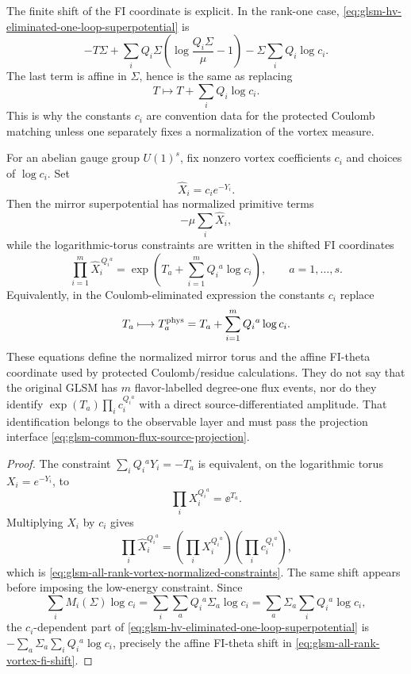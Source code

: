 The finite shift of the FI coordinate is explicit.  In the rank-one case,
\eqref{eq:glsm-hv-eliminated-one-loop-superpotential} is
\[
  -T\Sigma
  +
  \sum_iQ_i\Sigma
  \left(
    \log\frac{Q_i\Sigma}{\mu}-1
  \right)
  -
  \Sigma\sum_iQ_i\log c_i .
\]
The last term is affine in \(\Sigma\), hence is the same as replacing
\[
  T\longmapsto T+\sum_iQ_i\log c_i .
\]
This is why the constants \(c_i\) are convention data for the protected
Coulomb matching unless one separately fixes a normalization of the vortex
measure.

\begin{proposition}
\label{prop:glsm-vortex-normalization-fi-coordinate}
For an abelian gauge group \(U(1)^s\), fix nonzero vortex coefficients
\(c_i\) and choices of \(\log c_i\).  Set
\[
  \widehat X_i=c_i e^{-Y_i}.
\]
Then the mirror superpotential has normalized primitive terms
\[
  -\mu\sum_i\widehat X_i ,
\]
while the logarithmic-torus constraints are written in the shifted FI
coordinates
\begin{equation}
  \prod_{i=1}^m \widehat X_i^{\,Q_i{}^a}
  =
  \exp\left(T_a+\sum_{i=1}^m Q_i{}^a\log c_i\right),
  \qquad a=1,\ldots,s .
  \label{eq:glsm-all-rank-vortex-normalized-constraints}
\end{equation}
Equivalently, in the Coulomb-eliminated expression the constants \(c_i\)
replace
\begin{equation}
  T_a\longmapsto
  T_a^{\rm phys}
  =
  T_a+\sum_{i=1}^m Q_i{}^a\log c_i .
  \label{eq:glsm-all-rank-vortex-fi-shift}
\end{equation}
These equations define the normalized mirror torus and the affine FI-theta
coordinate used by protected Coulomb/residue calculations.  They do not say
that the original GLSM has \(m\) flavor-labelled degree-one flux events, nor do
they identify \(\exp(T_a)\prod_i c_i^{Q_i{}^a}\) with a direct
source-differentiated amplitude.  That identification belongs to the
observable layer and must pass the projection interface
\eqref{eq:glsm-common-flux-source-projection}.
\end{proposition}

\begin{proof}
The constraint \(\sum_i Q_i{}^aY_i=-T_a\) is equivalent, on the logarithmic
torus \(X_i=e^{-Y_i}\), to
\[
  \prod_iX_i^{Q_i{}^a}=\ee^{T_a}.
\]
Multiplying \(X_i\) by \(c_i\) gives
\[
  \prod_i\widehat X_i^{Q_i{}^a}
  =
  \left(\prod_iX_i^{Q_i{}^a}\right)
  \left(\prod_i c_i^{Q_i{}^a}\right),
\]
which is \eqref{eq:glsm-all-rank-vortex-normalized-constraints}.  The same
shift appears before imposing the low-energy constraint.  Since
\[
  \sum_i M_i(\Sigma)\log c_i
  =
  \sum_i\sum_a Q_i{}^a\Sigma_a\log c_i
  =
  \sum_a\Sigma_a\sum_iQ_i{}^a\log c_i ,
\]
the \(c_i\)-dependent part of
\eqref{eq:glsm-hv-eliminated-one-loop-superpotential} is
\(-\sum_a\Sigma_a\sum_iQ_i{}^a\log c_i\), precisely the affine FI-theta
shift in \eqref{eq:glsm-all-rank-vortex-fi-shift}.
\end{proof}

